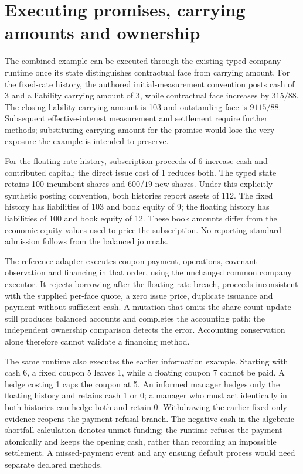 \section{Executing promises, carrying amounts and ownership}
The combined example can be executed through the existing typed company
runtime once its state distinguishes contractual face from carrying amount.
For the fixed-rate history, the authored initial-measurement convention posts
cash of 3 and a liability carrying amount of 3, while contractual face increases
by $315/88$. The closing liability carrying amount is 103 and outstanding face
is $9115/88$. Subsequent effective-interest measurement and settlement require
further methods; substituting carrying amount for the promise would lose the
very exposure the example is intended to preserve.

For the floating-rate history, subscription proceeds of 6 increase cash and
contributed capital; the direct issue cost of 1 reduces both. The typed state
retains 100 incumbent shares and $600/19$ new shares. Under this explicitly
synthetic posting convention, both histories report assets of 112. The fixed
history has liabilities of 103 and book equity of 9; the floating history has
liabilities of 100 and book equity of 12. These book amounts differ from the
economic equity values used to price the subscription. No reporting-standard
admission follows from the balanced journals.

The reference adapter executes coupon payment, operations, covenant observation
and financing in that order, using the unchanged common company executor.
It rejects borrowing after the floating-rate breach, proceeds inconsistent
with the supplied per-face quote, a zero issue price, duplicate issuance and
payment without sufficient cash. A mutation that omits the share-count update
still produces balanced accounts and completes the accounting path; the
independent ownership comparison detects the error. Accounting conservation
alone therefore cannot validate a financing method.

The same runtime also executes the earlier information example. Starting with
cash 6, a fixed coupon 5 leaves 1, while a floating coupon 7 cannot be paid.
A hedge costing 1 caps the coupon at 5. An informed manager hedges only the
floating history and retains cash 1 or 0; a manager who must act identically in
both histories can hedge both and retain 0. Withdrawing the earlier fixed-only
evidence reopens the payment-refusal branch. The negative cash in the algebraic
shortfall calculation denotes unmet funding; the runtime refuses the payment
atomically and keeps the opening cash, rather than recording an impossible
settlement. A missed-payment event and any ensuing default process would need
separate declared methods.

